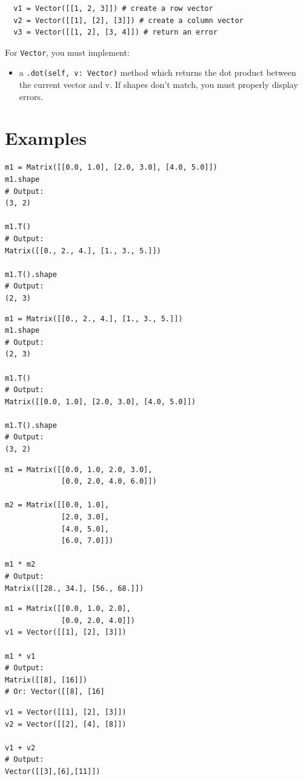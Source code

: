 \documentclass{42-en}
\begin{document}
\begin{verbatim}
  v1 = Vector([[1, 2, 3]]) # create a row vector
  v2 = Vector([[1], [2], [3]]) # create a column vector
  v3 = Vector([[1, 2], [3, 4]]) # return an error
\end{verbatim}

\par
For \texttt{Vector}, you must implement:
\begin{itemize}
  \item a \texttt{.dot(self, v: Vector)} method which returns the dot product between the current vector and v. If shapes don't match, you must properly display errors.
\end{itemize}


\section*{Examples}

\begin{verbatim}
m1 = Matrix([[0.0, 1.0], [2.0, 3.0], [4.0, 5.0]])
m1.shape
# Output:
(3, 2)

m1.T()
# Output:
Matrix([[0., 2., 4.], [1., 3., 5.]])

m1.T().shape
# Output:
(2, 3)
\end{verbatim}
\begin{verbatim}
m1 = Matrix([[0., 2., 4.], [1., 3., 5.]])
m1.shape
# Output:
(2, 3)

m1.T()
# Output:
Matrix([[0.0, 1.0], [2.0, 3.0], [4.0, 5.0]])

m1.T().shape
# Output:
(3, 2)
\end{verbatim}
\begin{verbatim}
m1 = Matrix([[0.0, 1.0, 2.0, 3.0], 
             [0.0, 2.0, 4.0, 6.0]])

m2 = Matrix([[0.0, 1.0],
             [2.0, 3.0],
             [4.0, 5.0],
             [6.0, 7.0]])

m1 * m2
# Output:
Matrix([[28., 34.], [56., 68.]])
\end{verbatim}
\begin{verbatim}
m1 = Matrix([[0.0, 1.0, 2.0],
             [0.0, 2.0, 4.0]])
v1 = Vector([[1], [2], [3]])

m1 * v1
# Output:
Matrix([[8], [16]])
# Or: Vector([[8], [16]
\end{verbatim}
\begin{verbatim}
v1 = Vector([[1], [2], [3]])
v2 = Vector([[2], [4], [8]])

v1 + v2
# Output:
Vector([[3],[6],[11]])
\end{verbatim}
\end{document}
